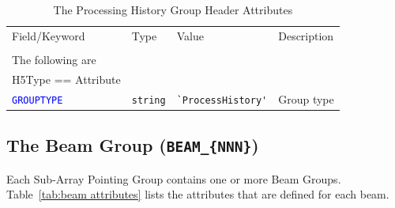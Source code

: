 \documentclass[a4paper,10pt,bibtotoc]{scrartcl}
\begin{document}
\begin{small}
\begin{table}[h]
\begin{small}
  \centering
  \begin{tabular}{|lllp{5.0cm}|}
    \hline
    \sc Field/Keyword  & \sc Type & \sc Value & Description \\
    \sc   & \sc & \sc & \\
    \hline \hline
    \sc The following are & \sc & \sc & \\
    \sc H5Type == Attribute & \sc & \sc & \\
    \hline
    \textcolor{blue}{\texttt{GROUPTYPE}}   & \verb|string|          & \verb|`ProcessHistory'| & Group type  \\
    \hline
  \end{tabular}
  \caption{The Processing History Group Header Attributes}
  \label{tab:process history attributes}
\end{small}
\end{table}
\end{small}


\clearpage
\subsection{The Beam Group ({\tt BEAM\_\{NNN\}})}
\label{sec:Beam group}

Each Sub-Array Pointing Group contains one or more Beam Groups. Table~\ref{tab:beam attributes} lists the attributes that are defined for each beam.

\vspace{15pt}
\end{document}
